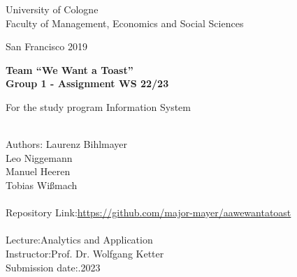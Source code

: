 \hypertarget{titlepage}{}%

\begin{titlepage}

    \begin{center}
        \large
        University of Cologne\\
        Faculty of Management, Economics and Social Sciences 

        \vspace*{1cm}
        \large
        San Francisco 2019

        \Huge
        \textbf{Team \enquote{We Want a Toast}\\ Group 1 - Assignment WS 22/23 }

        \vspace{1.5cm}
        \large
        For the study program Information System 
        \vspace{0.8cm}
    \end{center}

    \vfill

    \begin{flushleft}
        \normalsize
        \begin{tabbing}
            ~~~~~~~~~~~~~~~~~~~~~~~~~~~~~~~~~~~~~\=\\ \kill %
            Authors: \>Laurenz Bihlmayer\\ 
            \>Leo Niggemann\\
            \> Manuel Heeren\\
            \> Tobias Wißmach\\\\

            Repository Link:\>\url{https://github.com/major-mayer/aawewantatoast}\\\\
    
            Lecture:\>Analytics and Application \\
            Instructor:\>Prof. Dr. Wolfgang Ketter \\ 
            Submission date:.2023\\
        \end{tabbing}
   
    \end{flushleft}

\end{titlepage}
\restoregeometry
